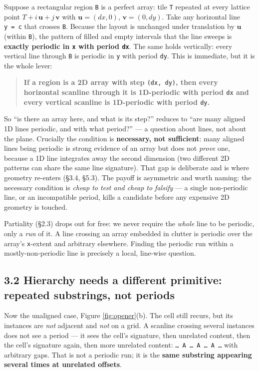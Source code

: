 \documentclass[
  11pt,
]{article}
\begin{document}
Suppose a rectangular region \texttt{B} is a perfect array: tile
\texttt{T} repeated at every lattice point
\(T + i\,\mathbf{u} + j\,\mathbf{v}\) with \(\mathbf{u} = (dx,0)\),
\(\mathbf{v} = (0,dy)\). Take any horizontal line \texttt{y\ =\ c} that
crosses \texttt{B}. Because the layout is unchanged under translation by
\(\mathbf{u}\) (within \texttt{B}), the pattern of filled and empty
intervals that the line sweeps is \textbf{exactly periodic in \texttt{x}
with period \texttt{dx}}. The same holds vertically: every vertical line
through \texttt{B} is periodic in \texttt{y} with period \texttt{dy}.
This is immediate, but it is the whole lever:

\begin{quote}
\textbf{If a region is a 2D array with step \texttt{(dx,\ dy)}, then
every horizontal scanline through it is 1D-periodic with period
\texttt{dx} and every vertical scanline is 1D-periodic with period
\texttt{dy}.}
\end{quote}

So ``is there an array here, and what is its step?'' reduces to ``are
many aligned 1D lines periodic, and with what period?'' --- a question
about lines, not about the plane. Crucially the condition is
\textbf{necessary, not sufficient}: many aligned lines being periodic is
strong evidence of an array but does not \emph{prove} one, because a 1D
line integrates away the second dimension (two different 2D patterns can
share the same line signature). That gap is deliberate and is where
geometry re-enters (§3.4, §5.3). The payoff is asymmetric and worth
naming: the necessary condition is \emph{cheap to test and cheap to
falsify} --- a single non-periodic line, or an incompatible period,
kills a candidate before any expensive 2D geometry is touched.

Partiality (§2.3) drops out for free: we never require the \emph{whole}
line to be periodic, only a \emph{run} of it. A line crossing an array
embedded in clutter is periodic over the array's \texttt{x}-extent and
arbitrary elsewhere. Finding the periodic run within a
mostly-non-periodic line is precisely a local, line-wise question.

\subsection{3.2 Hierarchy needs a different primitive: repeated
substrings, not
periods}\label{hierarchy-needs-a-different-primitive-repeated-substrings-not-periods}

Now the unaligned case, Figure \ref{fig:opener}(b). The cell still
recurs, but its instances are \emph{not} adjacent and \emph{not} on a
grid. A scanline crossing several instances does not see a period --- it
sees the cell's signature, then unrelated content, then the cell's
signature again, then more unrelated content:
\texttt{…\ A\ …\ A\ …\ A\ …} with arbitrary gaps. That is not a periodic
run; it is the \textbf{same substring appearing several times at
unrelated offsets}.
\end{document}
